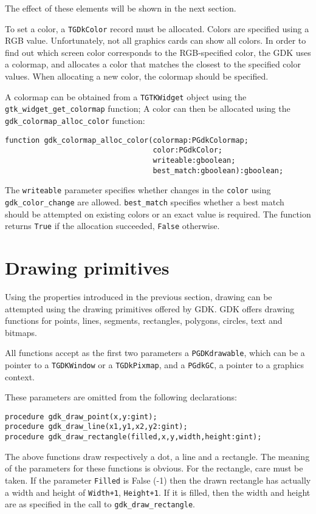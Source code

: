 \documentclass[10pt]{article}
\newcommand{\var}[1]{\texttt{#1}}
\begin{document}
The effect of these elements will be shown in the next section.

To set a color, a \var{TGDkColor} record must be allocated. Colors are
specified using a RGB value. Unfortunately, not all graphics cards can
show all colors. In order to find out which screen color corresponds 
to the RGB-specified color, the GDK uses a colormap, and allocates a
color that matches the closest to the specified color values. 
When allocating a new color, the colormap should be specified.

A colormap can be obtained from a \var{TGTKWidget} object using the
\var{gtk\_widget\_get\_colormap} function; A color can then be allocated
using the \var{gdk\_colormap\_alloc\_color} function:
\begin{verbatim}
function gdk_colormap_alloc_color(colormap:PGdkColormap; 
                                  color:PGdkColor;
                                  writeable:gboolean; 
                                  best_match:gboolean):gboolean;
\end{verbatim}
The \var{writeable} parameter specifies whether changes in the
\var{color} using \var{gdk\_color\_change} are allowed.
\var{best\_match} specifies whether a best match should be attempted 
on existing colors or an exact value is required.
The function returns \var{True} if the allocation succeeded, 
\var{False} otherwise.

\section{Drawing primitives}
Using the properties introduced in the previous section, drawing can be
attempted using the drawing primitives offered by GDK. GDK offers drawing
functions for points, lines, segments, rectangles, polygons, circles, text
and bitmaps.

All functions accept as the first two parameters a \var{PGDKdrawable}, which
can be a pointer to a \var{TGDKWindow} or a \var{TGDkPixmap}, and a 
\var{PGdkGC}, a pointer to a graphics context. 

These parameters are omitted from the following declarations:
\begin{verbatim}
procedure gdk_draw_point(x,y:gint);
procedure gdk_draw_line(x1,y1,x2,y2:gint);
procedure gdk_draw_rectangle(filled,x,y,width,height:gint);
\end{verbatim}
The above functions draw respectively a dot, a line and a rectangle.
The meaning of the parameters for these functions is obvious.
For the rectangle, care must be taken. If the parameter \var{Filled} is 
False (-1) then the drawn rectangle has actually a width and height of
\var{Width+1}, \var{Height+1}. If it is filled, then the width and 
height are as specified in the call to \var{gdk\_draw\_rectangle}.
\end{document}
